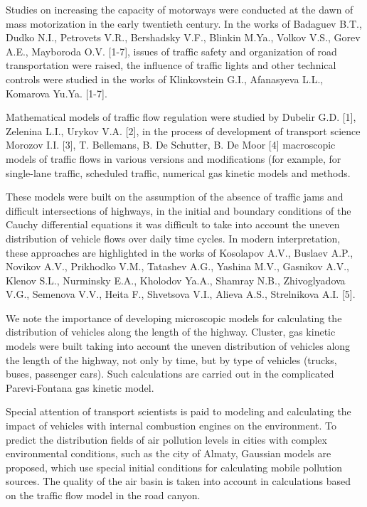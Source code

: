 \begin{multicols}{2}
Studies on increasing the capacity of motorways were conducted at the
dawn of mass motorization in the early twentieth century. In the works
of Badaguev B.T., Dudko N.I., Petrovets V.R., Bershadsky V.F., Blinkin
M.Ya., Volkov V.S., Gorev A.E., Mayboroda O.V. {[}1-7{]}, issues of
traffic safety and organization of road transportation were raised, the
influence of traffic lights and other technical controls were studied in
the works of Klinkovstein G.I., Afanasyeva L.L., Komarova Yu.Ya.
{[}1-7{]}.

Mathematical models of traffic flow regulation were studied by Dubelir
G.D. {[}1{]}, Zelenina L.I., Urykov V.A. {[}2{]}, in the process of
development of transport science Morozov I.I. {[}3{]}, T. Bellemans, B.
De Schutter, B. De Moor {[}4{]} macroscopic models of traffic flows in
various versions and modifications (for example, for single-lane
traffic, scheduled traffic, numerical gas kinetic models and methods.

These models were built on the assumption of the absence of traffic jams
and difficult intersections of highways, in the initial and boundary
conditions of the Cauchy differential equations it was difficult to take
into account the uneven distribution of vehicle flows over daily time
cycles. In modern interpretation, these approaches are highlighted in
the works of Kosolapov A.V., Buslaev A.P., Novikov A.V., Prikhodko V.M.,
Tatashev A.G., Yashina M.V., Gasnikov A.V., Klenov S.L., Nurminsky E.A.,
Kholodov Ya.A., Shamray N.B., Zhivoglyadova V.G., Semenova V.V., Heita
F., Shvetsova V.I., Alieva A.S., Strelnikova A.I. {[}5{]}.

We note the importance of developing microscopic models for calculating
the distribution of vehicles along the length of the highway. Cluster,
gas kinetic models were built taking into account the uneven
distribution of vehicles along the length of the highway, not only by
time, but by type of vehicles (trucks, buses, passenger cars). Such
calculations are carried out in the complicated Parevi-Fontana gas
kinetic model.

Special attention of transport scientists is paid to modeling and
calculating the impact of vehicles with internal combustion engines on
the environment. To predict the distribution fields of air pollution
levels in cities with complex environmental conditions, such as the city
of Almaty, Gaussian models are proposed, which use special initial
conditions for calculating mobile pollution sources. The quality of the
air basin is taken into account in calculations based on the traffic
flow model in the road canyon.


\end{multicols}
